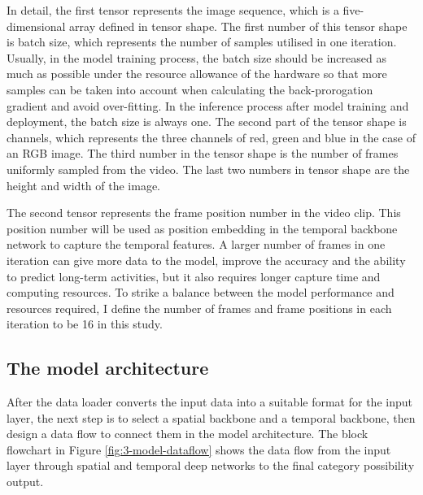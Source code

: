 In detail, the first tensor represents the image sequence, which is a five-dimensional array defined in tensor shape.
The first number of this tensor shape is batch size, which represents the number of samples utilised in one iteration.
Usually, in the model training process, the batch size should be increased as much as possible under the resource allowance of the hardware so that more samples can be taken into account when calculating the back-prorogation gradient and avoid over-fitting.
In the inference process after model training and deployment, the batch size is always one.
The second part of the tensor shape is channels, which represents the three channels of red, green and blue in the case of an RGB image.
The third number in the tensor shape is the number of frames uniformly sampled from the video.
The last two numbers in tensor shape are the height and width of the image.

The second tensor represents the frame position number in the video clip.
This position number will be used as position embedding in the temporal backbone network to capture the temporal features.
A larger number of frames in one iteration can give more data to the model, improve the accuracy and the ability to predict long-term activities, but it also requires longer capture time and computing resources.
To strike a balance between the model performance and resources required, I define the number of frames and frame positions in each iteration to be 16 in this study.

\subsection{The model architecture}
After the data loader converts the input data into a suitable format for the input layer, the next step is to select a spatial backbone and a temporal backbone, then design a data flow to connect them in the model architecture.
The block flowchart in Figure \ref{fig:3-model-dataflow} shows the data flow from the input layer through spatial and temporal deep networks to the final category possibility output.

